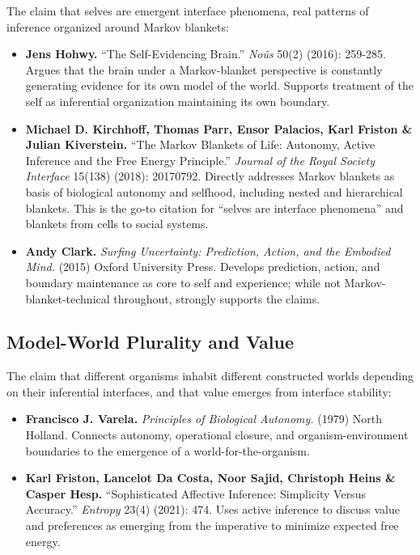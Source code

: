 \documentclass[
  openright]{book}
\begin{document}
The claim that selves are emergent interface phenomena, real patterns of
inference organized around Markov blankets:

\begin{itemize}
\item
  \textbf{Jens Hohwy.} ``The Self-Evidencing Brain.'' \emph{Noûs} 50(2)
  (2016): 259-285. Argues that the brain under a Markov-blanket
  perspective is constantly generating evidence for its own model of the
  world. Supports treatment of the self as inferential organization
  maintaining its own boundary.
\item
  \textbf{Michael D. Kirchhoff, Thomas Parr, Ensor Palacios, Karl
  Friston \& Julian Kiverstein.} ``The Markov Blankets of Life:
  Autonomy, Active Inference and the Free Energy Principle.''
  \emph{Journal of the Royal Society Interface} 15(138) (2018):
  20170792. Directly addresses Markov blankets as basis of biological
  autonomy and selfhood, including nested and hierarchical blankets.
  This is the go-to citation for ``selves are interface phenomena'' and
  blankets from cells to social systems.
\item
  \textbf{Andy Clark.} \emph{Surfing Uncertainty: Prediction, Action,
  and the Embodied Mind.} (2015) Oxford University Press. Develops
  prediction, action, and boundary maintenance as core to self and
  experience; while not Markov-blanket-technical throughout, strongly
  supports the claims.
\end{itemize}

\subsection{Model-World Plurality and
Value}\label{model-world-plurality-and-value}

The claim that different organisms inhabit different constructed worlds
depending on their inferential interfaces, and that value emerges from
interface stability:

\begin{itemize}
\item
  \textbf{Francisco J. Varela.} \emph{Principles of Biological
  Autonomy.} (1979) North Holland. Connects autonomy, operational
  closure, and organism-environment boundaries to the emergence of a
  world-for-the-organism.
\item
  \textbf{Karl Friston, Lancelot Da Costa, Noor Sajid, Christoph Heins
  \& Casper Hesp.} ``Sophisticated Affective Inference: Simplicity
  Versus Accuracy.'' \emph{Entropy} 23(4) (2021): 474. Uses active
  inference to discuss value and preferences as emerging from the
  imperative to minimize expected free energy.
\end{itemize}
\end{document}

